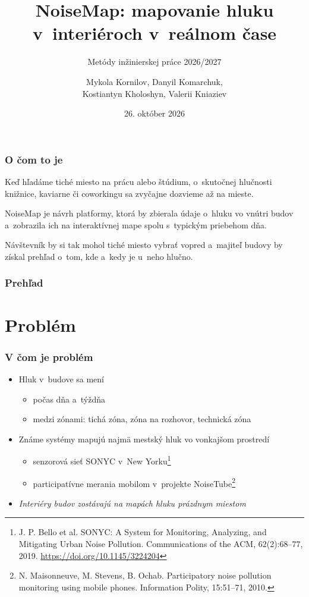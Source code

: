 \documentclass{beamer}
\author[Kornilov, Komarchuk, Kholoshyn, Kniaziev]{
	Mykola Kornilov, Danyil Komarchuk,\\
	Kostiantyn Kholoshyn, Valerii Kniaziev}
\institute{
	Fakulta informatiky a informačných technológií\\
	Slovenská technická univerzita v Bratislave}
\subtitle{\vspace{3mm} Metódy inžinierskej práce 2026/2027}
\title[NoiseMap]{NoiseMap: mapovanie hluku v~interiéroch v~reálnom čase
}
\date{\footnotesize 26. október 2026} %
\newcommand{\footcite}[1]{\footnote{\tiny #1}}
\newcommand{\emp}[1]{\textit{\alert{#1}}}
\begin{document}
\begin{frame}[fragile=singleslide]
\titlepage
\end{frame}


\begin{frame}[fragile=singleslide]\frametitle{O čom to je}
Keď hľadáme tiché miesto na prácu alebo štúdium, o~skutočnej hlučnosti knižnice, kaviarne či coworkingu sa zvyčajne dozvieme až na mieste.

\bigskip
NoiseMap je návrh platformy, ktorá by zbierala údaje o~hluku vo vnútri budov a~zobrazila ich na interaktívnej mape spolu s~typickým priebehom dňa.

\bigskip
Návštevník by si tak mohol tiché miesto vybrať vopred a~majiteľ budovy by získal prehľad o~tom, kde a~kedy je u~neho hlučno.
\end{frame}


\begin{frame}[fragile=singleslide]\frametitle{Prehľad}
\tableofcontents
\end{frame}


\section{Problém}

\begin{frame}[fragile=singleslide]\frametitle{V čom je problém}
\begin{itemize}
\item Hluk v~budove sa mení
	\begin{itemize}
	\item počas dňa a~týždňa
	\item medzi zónami: tichá zóna, zóna na rozhovor, technická zóna
	\end{itemize}
\item Známe systémy mapujú najmä mestský hluk vo vonkajšom prostredí
	\begin{itemize}
	\item senzorová sieť SONYC v~New Yorku\footcite{J. P. Bello et al. SONYC: A System for Monitoring, Analyzing, and Mitigating Urban Noise Pollution. Communications of the ACM, 62(2):68--77, 2019. \url{https://doi.org/10.1145/3224204}}
	\item participatívne merania mobilom v~projekte NoiseTube\footcite{N. Maisonneuve, M. Stevens, B. Ochab. Participatory noise pollution monitoring using mobile phones. Information Polity, 15:51--71, 2010.}
	\end{itemize}
\item \emp{Interiéry budov zostávajú na mapách hluku prázdnym miestom}
\end{itemize}
\end{frame}
\end{document}
